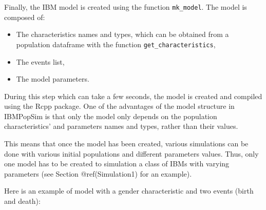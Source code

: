 Finally, the IBM model is created using the function \texttt{mk\_model}. The model is composed of:

\begin{itemize}
\tightlist
\item
  The characteristics names and types, which can be obtained from a population dataframe with the function \texttt{get\_characteristics},
\item
  The events list,
\item
  The model parameters.
\end{itemize}

\begin{Shaded}
\begin{Highlighting}[]
\StringTok{ }\NormalTok{(} 
\end{Highlighting}
\end{Shaded}

During this step which can take a few seconds, the model is created and compiled using the Rcpp package.
One of the advantages of the model structure in IBMPopSim is that only the model only depends on the population characteristics' and parameters names and types, rather than their values.

This means that once the model has been created, various simulations can be done with various initial populations and different parameters values. Thus, only one model has to be created to simulation a class of IBMs with varying parameters (see Section @ref(Simulation1) for an example).

Here is an example of model with a gender characteristic and two events (birth and death):

